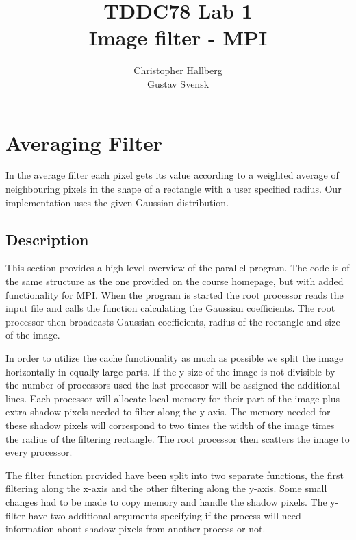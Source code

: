 \documentclass[a4paper, 12pt]{article}
\begin{document}
\title{TDDC78 Lab 1\\
        Image filter - MPI}
\author{Christopher Hallberg \\
        Gustav Svensk}
\maketitle

\thispagestyle{empty}

\newpage
\setcounter{page}{1}
\tableofcontents
\newpage

\section{Averaging Filter}
In the average filter each pixel gets its value according to a weighted average
of neighbouring pixels in the shape of a rectangle with a user specified radius. 
Our implementation uses the given Gaussian distribution.

\subsection{Description}
This section provides a high level overview of the parallel program. 
The code is of the same structure as the one provided on the course homepage,
but with added functionality for MPI. When the
program is started the root processor reads the input file and calls
the function calculating the Gaussian coefficients. The root processor then
broadcasts Gaussian coefficients, radius of the rectangle and size of the image.


In order to utilize the cache functionality as much as possible we split the image
horizontally in equally large parts. If the y-size of the image is not divisible
by the number of processors used the last processor will be assigned the
additional lines. Each processor will allocate local memory for their part of the
image plus extra shadow pixels needed to filter along the y-axis. The memory
needed for these shadow pixels will correspond to two times the width of the
image times the radius of the filtering rectangle. The root processor then 
scatters the image to every processor.  

The filter function provided have been split into two separate functions, the
first filtering along the x-axis and the other filtering along the y-axis. Some
small changes had to be made to copy memory and handle the shadow pixels. The
y-filter have two additional arguments specifying if the process will need
information about shadow pixels from another process or not. 
\end{document}
